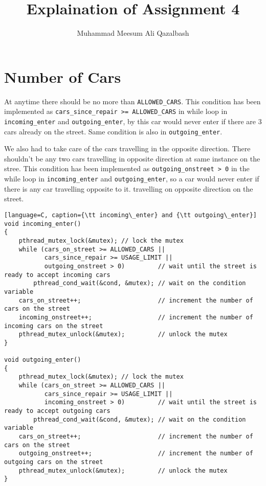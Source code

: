 \documentclass{article}
\title{Explaination of Assignment 4}
\author{Muhammad Meesum Ali Qazalbash}
\theoremstyle{mytheoremstyle}
\theoremstyle{mytheoremstyle}
\theoremstyle{myproblemstyle}
\begin{document}
\maketitle
\section{Number of Cars}
At anytime there should be no more than {\tt ALLOWED\_CARS}. This condition has been implemented as {\tt cars\_since\_repair >= ALLOWED\_CARS} in while loop in {\tt incoming\_enter} and {\tt outgoing\_enter}, by this car would never enter if there are 3 cars already on the street. Same condition is also in {\tt outgoing\_enter}.

We also had to take care of the cars travelling in the opposite direction. There shouldn't be any two cars travelling in opposite direction at same instance on the stree. This condition has been implemented as {\tt outgoing\_onstreet > 0} in the while loop in {\tt incoming\_enter} and {\tt outgoing\_enter}, so a car would never enter if there is any car travelling opposite to it.
travelling on opposite direction on the street.
\begin{lstlisting}[language=C, caption={\tt incoming\_enter} and {\tt outgoing\_enter}]
void incoming_enter()
{
	pthread_mutex_lock(&mutex); // lock the mutex
	while (cars_on_street >= ALLOWED_CARS ||
		   cars_since_repair >= USAGE_LIMIT ||
		   outgoing_onstreet > 0)		  // wait until the street is ready to accept incoming cars
		pthread_cond_wait(&cond, &mutex); // wait on the condition variable
	cars_on_street++;					  // increment the number of cars on the street
	incoming_onstreet++;				  // increment the number of incoming cars on the street
	pthread_mutex_unlock(&mutex);		  // unlock the mutex
}

void outgoing_enter()
{
	pthread_mutex_lock(&mutex); // lock the mutex
	while (cars_on_street >= ALLOWED_CARS ||
		   cars_since_repair >= USAGE_LIMIT ||
		   incoming_onstreet > 0)		  // wait until the street is ready to accept outgoing cars
		pthread_cond_wait(&cond, &mutex); // wait on the condition variable
	cars_on_street++;					  // increment the number of cars on the street
	outgoing_onstreet++;				  // increment the number of outgoing cars on the street
	pthread_mutex_unlock(&mutex);		  // unlock the mutex
}
    \end{lstlisting}
\end{document}
